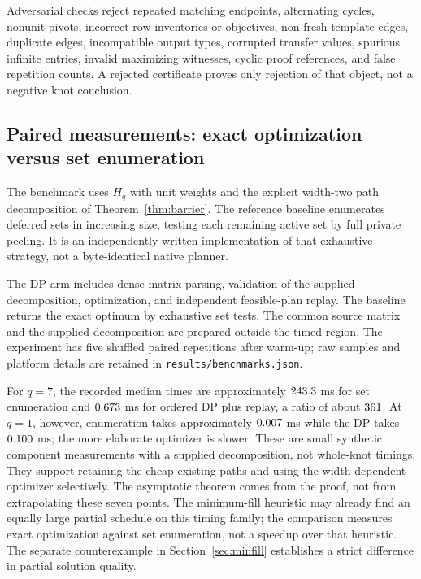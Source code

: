 \documentclass[11pt,a4paper]{article}
\theoremstyle{definition}
\theoremstyle{remark}
\newcommand{\code}[1]{\nolinkurl{#1}}
\begin{document}
Adversarial checks reject repeated matching endpoints, alternating cycles,
nonunit pivots, incorrect row inventories or objectives, non-fresh template
edges, duplicate edges, incompatible output types, corrupted transfer
values, spurious infinite entries, invalid maximizing witnesses, cyclic
proof references, and false repetition counts. A rejected certificate
proves only rejection of that object, not a negative knot conclusion.

\subsection{Paired measurements: exact optimization versus set enumeration}
The benchmark uses $H_q$ with unit weights and the explicit width-two path
decomposition of Theorem~\ref{thm:barrier}. The reference baseline
enumerates deferred sets in increasing size, testing each remaining active
set by full private peeling. It is an independently written implementation
of that exhaustive strategy, not a byte-identical native planner.

The DP arm includes dense matrix parsing, validation of the supplied
decomposition, optimization, and independent feasible-plan replay. The
baseline returns the exact optimum by exhaustive set tests. The common
source matrix and the supplied decomposition are prepared outside the
timed region. The experiment has five shuffled paired repetitions after
warm-up; raw samples and platform details are retained in
\code{results/benchmarks.json}.

\begin{center}\small

\end{center}

For $q=7$, the recorded median times are approximately $243.3$ ms for set
enumeration and $0.673$ ms for ordered DP plus replay, a ratio of about
$361$. At $q=1$, however, enumeration takes approximately $0.007$ ms while
the DP takes $0.100$ ms; the more elaborate optimizer is slower. These are
small synthetic component measurements with a supplied decomposition, not
whole-knot timings. They support retaining the cheap existing paths and
using the width-dependent optimizer selectively. The asymptotic theorem
comes from the proof, not from extrapolating these seven points. The
minimum-fill heuristic may already find an equally large partial schedule
on this timing family; the comparison measures exact optimization against
set enumeration, not a speedup over that heuristic. The separate
counterexample in Section~\ref{sec:minfill} establishes a strict difference
in partial solution quality.
\end{document}
